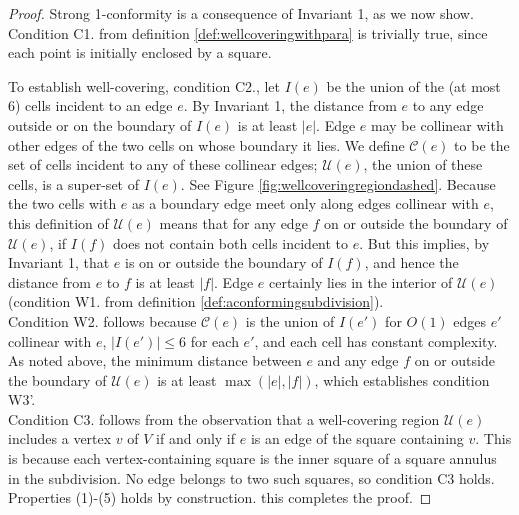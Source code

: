 \begin{proof}
Strong 1-conformity is a consequence of Invariant 1, as we now show. Condition C1. from definition \ref{def:wellcoveringwithpara} is trivially true, since each point is initially enclosed by a square. 

To establish well-covering, condition C2., let $I(e)$ be the union of the (at most 6) cells incident to an edge $e$. By Invariant 1, the distance from $e$ to any edge outside or on the boundary of $I(e)$ is at least $|e|$. Edge $e$ may be collinear with other edges of the two cells on whose boundary it lies. We define $\mathcal{C}(e)$ to be the set of cells incident to any of these collinear edges; $\mathcal{U}(e)$, the union of these cells, is a super-set of $I(e)$. See Figure \ref{fig:wellcoveringregiondashed}. Because the two cells with $e$ as a boundary edge meet only along edges collinear with $e$, this definition of $\mathcal{U}(e)$ means that for any edge $f$ on or outside the boundary of $\mathcal{U}(e)$, if $I(f)$ does not contain both cells incident to $e$. But this implies, by Invariant 1, that $e$ is on or outside the boundary of $I(f)$, and hence the distance from $e$ to $f$ is at least $|f|$. Edge $e$ certainly lies in the interior of $\mathcal{U}(e)$ (condition W1. from definition \ref{def:aconformingsubdivision}). \\

Condition W2. follows because $\mathcal{C}(e)$ is the union of $I(e')$ for $O(1)$ edges $e'$ collinear with $e$, $|I(e')|\leq 6$ for each $e'$, and each cell has constant complexity. As noted above, the minimum distance between $e$ and any edge $f$ on or outside the boundary of $\mathcal{U}(e)$ is at least $\max(|e|,|f|)$, which establishes condition W3'. \\

Condition C3. follows from the observation that a well-covering region $\mathcal{U}(e)$ includes a vertex $v$ of $V$ if and only if $e$ is an edge of the square containing $v$. This is because each vertex-containing square is the inner square of a square annulus in the subdivision. No edge belongs to two such squares, so condition C3 holds. \\

Properties (1)-(5) holds by construction. this completes the proof.
\end{proof}

